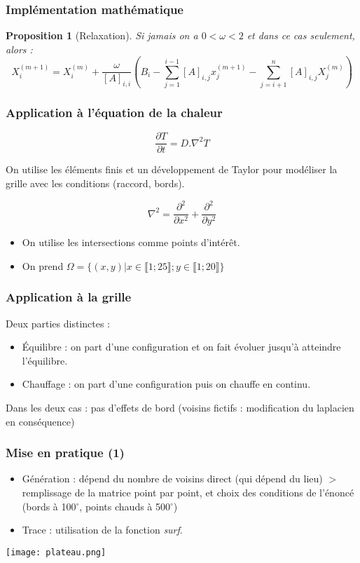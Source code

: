 \documentclass[11pt]{beamer}
\newtheorem{proposition}{Proposition}[section]
\begin{document}
	\begin{frame}
		\frametitle{Implémentation mathématique}
		\begin{proposition}[Relaxation]
			Si jamais on a $0<\omega<2$ et dans ce cas seulement, alors :
			\[X_i^{(m+1)}=X_i^{(m)}+\frac{\omega}{[A]_{i,i}}\left(B_i - \sum_{j=1}^{i-1} [A]_{i,j} x_j^{(m+1)} - \sum_{j=i+1}^{n} [A]_{i,j} X_j^{(m)}\right)\]
		\end{proposition}
	\end{frame}
	\begin{frame}
		\frametitle{Application à l'équation de la chaleur}		
		\[\frac{\partial T}{\partial t}=D.\nabla^2 T\]
		
		On utilise les éléments finis et un développement de Taylor pour modéliser la grille avec les conditions (raccord, bords).
		
		\[\nabla^2=\frac{\partial^2}{\partial x^2}+\frac{\partial^2}{\partial y^2}\]
	
		\begin{itemize}
			\item On utilise les intersections comme points d'intérêt.
			\item On prend $\Omega=\{(x,y)|x\in\llbracket1; 25\rrbracket; y\in\llbracket 1; 20\rrbracket\}$
		\end{itemize}
	\end{frame}

	\begin{frame}
		\frametitle{Application à la grille}
		Deux parties distinctes :
		\begin{itemize}
			\item Équilibre : on part d'une configuration et on fait évoluer jusqu'à atteindre l'équilibre.
			\item Chauffage : on part d'une configuration puis on chauffe en continu.
		\end{itemize}
	
		Dans les deux cas : pas d'effets de bord (voisins fictifs : modification du laplacien en conséquence)
	\end{frame}

	\begin{frame}
		\frametitle{Mise en pratique (1)}
		\begin{itemize}
			\item Génération : dépend du nombre de voisins direct (qui dépend du lieu) $>$ remplissage de la matrice point par point, et choix des conditions de l'énoncé (bords à 100$^\circ$, points chauds à 500$^\circ$)
			\item Trace : utilisation de la fonction \emph{surf}.
		\end{itemize}
		\begin{center}
			\texttt{[image: plateau.png]}
		\end{center}
	\end{frame}
	
\end{document}
